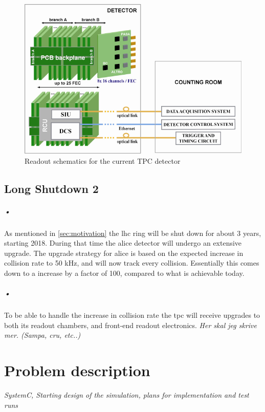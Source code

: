 \documentclass[a4paper]{report}
\begin{document}
\begin{figure}[h!]
  \centering
    \includegraphics[width=1.0\textwidth]{images/altro.png}
     \caption{Readout schematics for the current TPC detector}
    \label{fig:altro}
\end{figure}

\section{Long Shutdown 2}
\paragraph{•}
As mentioned in \ref{sec:motivation} the \gls{lhc} ring will be shut down for about 3 years, starting 2018.
During that time the \gls{alice} detector will undergo an extensive upgrade.
The upgrade strategy for \gls{alice} is based on the expected increase in collision rate to 50 kHz, and will now track every collision.
Essentially this comes down to a increase by a factor of 100, compared to what is achievable today.

\paragraph{•}
To be able to handle the increase in collision rate the \gls{tpc} will receive upgrades to both its readout chambers, and front-end readout electronics.
\textit{Her skal jeg skrive mer. (Sampa, cru, etc..)}


\chapter{Problem description}
\textit{SystemC, Starting design of the simulation, plans for implementation and test runs}
\end{document}
